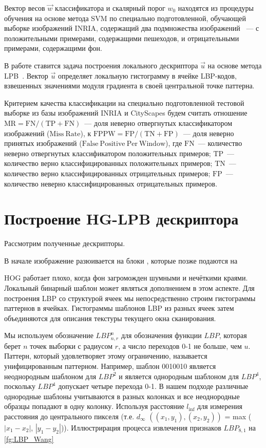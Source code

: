 \documentclass[12pt,twoside]{article}
\begin{document}
	Вектор весов $\vec{w}$ классификатора и скалярный порог $w_{0}$ находятся из процедуры обучения на основе метода SVM \cite{dalaltriggs2005} по специально подготовленной, обучающей выборке изображений INRIA, содержащий два подмножества изображений ~--- с положительными примерами, содержащими пешеходов, и отрицательными примерами, содержащими фон.

В работе ставится задача построения локального дескриптора $\vec{u}$ на основе метода LPB~\cite{Wang09}. Вектор $\vec{u}$ определяет локальную гистограмму в ячейке LBP-кодов, взвешенных значениями модуля градиента в своей центральной точке паттерна.

	Критерием качества классификации  на специально
	подготовленной тестовой выборке из базы изображений INRIA \cite{inria} и CityScapes
	будем считать отношение $\mathrm{MR} = \mathrm{FN}/(\mathrm{TP}+\mathrm{FN})$~---
	доля неверно отвергнутых классификатором изображений ($\mathrm{Miss\ Rate}$),
	к $\mathrm{FPPW} = \mathrm{FP}/(\mathrm{TN}+\mathrm{FP})$~---
	доля неверно принятых изображений ($\mathrm{False\ Positive\ Per\
	Window}$), где $\mathrm{FN}$~--- количество неверно отвергнутых
	классификатором положительных примеров; $\mathrm{TP}$~---
	количество верно классифицированных положительных примеров;
	$\mathrm{TN}$~--- количество верно классифицированных отрицательных
	примеров; $\mathrm{FP}$~--- количество неверно классифицированных отрицательных примеров.


\section{Построение HG-LPB дескриптора}
Рассмотрим полученные дескрипторы.

В начале изображение разюивается на блоки , которые позже подаются на 


HOG работает плохо, когда фон загроможден шумными и нечёткими краями. Локальный бинарный шаблон может являться дополнением в этом аспекте. Для построения LBP со структурой ячеек мы непосредственно строим гистограммы паттернов в ячейках. Гистограммы шаблонов LBP из разных ячеек затем объединяются для описания текстуры текущего окна сканирования.

 Мы используем обозначение $LBP^{n}_{n,r}$ для обозначения функции $LBP$, которая берет $n$ точек выборки с радиусом $r$, а число переходов 0-1 не больше, чем $u$. Паттерн, который удовлетворяет этому ограничению, называется унифицированным паттерном. Например, шаблон 0010010 является неоднородным шаблоном для $LBP^2$ и является однородным шаблоном для $LBP^4$, поскольку $LBP^4$ допускает четыре перехода 0-1. В нашем подходе различные однородные шаблоны учитываются в разных колонках и все неоднородные образцы попадают в одну колонку.
  Используя расстояние $l_{\inf}$ для измерения расстояния до центрального пикселя
   (т.е. $d_{\infty}$ $((x_{1}, y_{1}), (x_{2}, y_{2}))$ =
    max ($|x_{1} - x_{2}|$,
     $| y_{1} - y_{2} |$)). 
  Иллюстрирация процесса извлечения признаков $LBP_{8,1}$ на \ref{fg:LBP_Wang}
\end{document}
